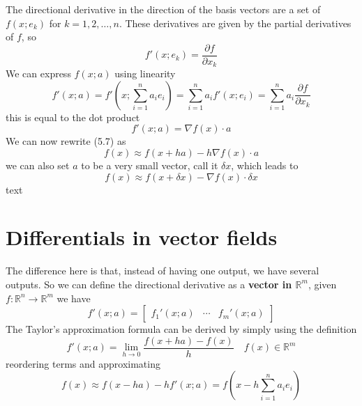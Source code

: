 \documentclass[../linear-spaces.tex]{subfiles}
\begin{document}
The directional derivative in the direction of the basis vectors are a set 
of $f(x; e_k)$ for $k = 1,2,\dots,n$. These derivatives are given by the partial 
derivatives of $f$, so 
\begin{equation}
    f'(x; e_k) = \dfrac{\partial f}{\partial x_k}
\end{equation}
We can express $f(x; a)$ using linearity 
\begin{equation}
    f'(x; a) = f'\left(x; \sum_{i=1}^{n}{a_i e_i} \right)
    = \sum_{i=1}^{n}a_i f'\left(x; e_i\right) = 
    \sum_{i=1}^{n}a_i \dfrac{\partial f}{\partial x_k}
\end{equation}
this is equal to the dot product
\begin{equation}
    f'(x; a) = \nabla f(x) \cdot a
\end{equation}
We can now rewrite (5.7) as 
\begin{equation}
    f(x) \approx f(x+ha) - h\nabla f(x)\cdot a
\end{equation}
we can also set $a$ to be a very small vector, call it $\delta x$, which leads to
\begin{equation}
    f(x) \approx f(x+\delta x) - \nabla f(x)\cdot \delta x
\end{equation}
text
\section{Differentials in vector fields}
The difference here is that, instead of having one output, we have several outputs. So we can define 
the directional derivative as a \textbf{vector in $\mathbb{R}^{m}$}, given $f: \mathbb{R}^{n} \to \mathbb{R}^{m}$ we have 
\begin{equation}
    f'(x; a) = \begin{bmatrix}
        f_1'(x; a) & \cdots & f_m'(x; a)
    \end{bmatrix}
\end{equation}
The Taylor's approximation formula can be derived by simply using the definition 
\begin{equation}
    f'(x; a) = \lim_{h\to 0}\dfrac{f(x + ha)-f(x)}{h}\quad f(x)\in\mathbb{R}^{m}
\end{equation}
reordering terms and approximating
\begin{equation}
    f(x) \approx  f(x-ha)- hf'(x; a) = f(x-h\sum_{i=1}^{n}{a_i e_i})
\end{equation}
\end{document}
